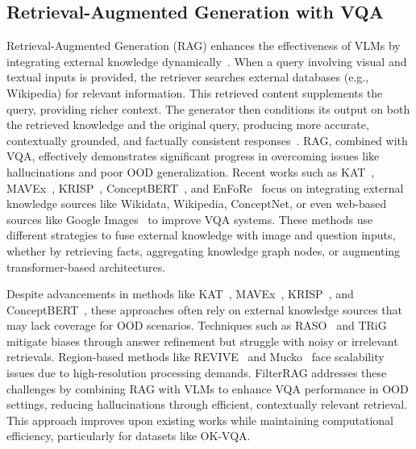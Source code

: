 \subsection{Retrieval-Augmented Generation with VQA}
Retrieval-Augmented Generation (RAG) enhances the effectiveness of VLMs by integrating external knowledge dynamically~\cite{lewis2020retrieval, ram2023context, karpukhin2020dense}. When a query involving visual and textual inputs is provided, the retriever searches external databases (e.g., Wikipedia) for relevant information. This retrieved content supplements the query, providing richer context. The generator then conditions its output on both the retrieved knowledge and the original query, producing more accurate, contextually grounded, and factually consistent responses~\cite{guo2022survey}. RAG, combined with VQA, effectively demonstrates significant progress in overcoming issues like hallucinations and poor OOD generalization. Recent works such as KAT~\cite{gui2021kat}, MAVEx~\cite{wu2022multi}, KRISP~\cite{marino2021krisp}, ConceptBERT~\cite{garderes2020conceptbert}, and EnFoRe~\cite{wu2022entity} focus on integrating external knowledge sources like Wikidata, Wikipedia, ConceptNet, or even web-based sources like Google Images~\cite{wu2022multi} to improve VQA systems. These methods use different strategies to fuse external knowledge with image and question inputs, whether by retrieving facts, aggregating knowledge graph nodes, or augmenting transformer-based architectures.

Despite advancements in methods like KAT~\cite{gui2021kat}, MAVEx~\cite{wu2022multi}, KRISP~\cite{marino2021krisp}, and ConceptBERT~\cite{garderes2020conceptbert}, these approaches often rely on external knowledge sources that may lack coverage for OOD  scenarios. Techniques such as RASO~\cite{fu2023generate} and TRiG~\cite{gao2022thousand} mitigate biases through answer refinement but struggle with noisy or irrelevant retrievals. Region-based methods like REVIVE~\cite{lin2022revive} and Mucko~\cite{zhu2020mucko} face scalability issues due to high-resolution processing demands. FilterRAG addresses these challenges by combining RAG with VLMs to enhance VQA performance in OOD settings, reducing hallucinations through efficient, contextually relevant retrieval. This approach improves upon existing works while maintaining computational efficiency, particularly for datasets like OK-VQA.

